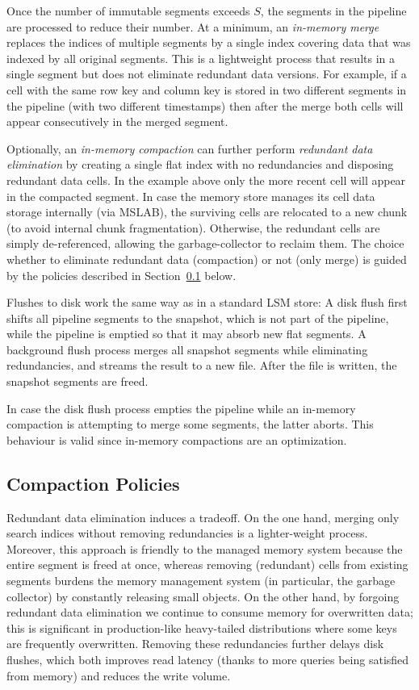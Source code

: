 Once the number of immutable segments exceeds $S$, the segments in the pipeline are processed to reduce their number.
At a minimum, an \emph{in-memory merge} replaces the indices of multiple segments by a single index covering data that was 
indexed by all original segments. This is a lightweight process that results in a single segment but does not eliminate redundant data versions.
For example, if a cell with the same row key and column key is stored in two different segments in the pipeline (with two different timestamps) then after the merge both cells will appear consecutively in the merged segment. 

Optionally, an \emph{in-memory compaction} can further perform \emph{redundant data elimination} by
creating a single flat index with no redundancies and disposing redundant data cells. In the example above only the more recent cell will appear in the compacted segment.
In case the memory store manages its cell data storage internally (via MSLAB), the surviving cells are relocated
to a new chunk (to avoid internal chunk fragmentation). Otherwise, the redundant cells are simply de-referenced, allowing the garbage-collector to reclaim them.    
%
The choice whether to eliminate redundant data (compaction) or not (only merge) is guided by the policies described in Section~\ref{ssec:policies} below.

Flushes to disk work the same way as in a standard LSM store: A disk flush first shifts all pipeline segments to the snapshot, which is not part of the pipeline, while the pipeline is emptied so that
it may absorb new flat segments. 
A background flush process merges all snapshot segments while eliminating  redundancies, and streams the result to a new file. 
After the file is written, the snapshot segments are freed. 

In case the disk flush process empties the pipeline while an in-memory compaction  is attempting to merge some segments, the latter aborts.  This behaviour is valid since in-memory compactions are an optimization.

\subsection{Compaction Policies} \label{ssec:policies}

Redundant data elimination induces a tradeoff. On the one hand,
merging only search indices without removing redundancies is a lighter-weight process.  
Moreover, this approach is friendly to the managed memory system because the entire segment is freed at once, whereas 
removing (redundant) cells from existing segments burdens the memory management system (in particular, the garbage collector) by
constantly releasing small objects. On the other hand, by forgoing redundant data elimination we continue to 
consume memory for overwritten data; this is significant in production-like heavy-tailed distributions where some keys are frequently overwritten.
Removing these redundancies further delays disk flushes, which both improves read latency  (thanks to more 
queries being satisfied from memory) and reduces the write volume.

